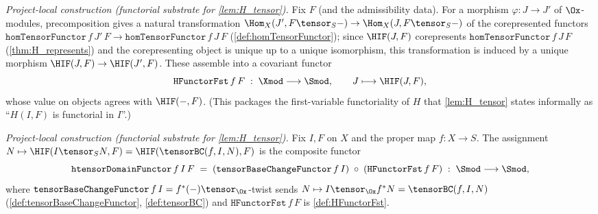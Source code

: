 \begin{definition}

  \label{def:HFunctorFst}
  \textit{Project-local construction (functorial substrate for \cref{lem:H_tensor}).}
  Fix $F$ (and the admissibility data). For a morphism $\varphi : J \to J'$ of
  $\Ox$-modules, precomposition gives a natural transformation
  $\Hom_X(J', F \tensor_S -) \to \Hom_X(J, F \tensor_S -)$ of the corepresented
  functors $\mathtt{homTensorFunctor}\,f\,J'\,F \to \mathtt{homTensorFunctor}\,f\,J\,F$
  (\cref{def:homTensorFunctor}); since $\HIF(J,F)$ corepresents
  $\mathtt{homTensorFunctor}\,f\,J\,F$ (\cref{thm:H_represents}) and the corepresenting
  object is unique up to a unique isomorphism, this transformation is induced by a
  unique morphism $\HIF(J,F) \to \HIF(J',F)$. These assemble into a covariant functor
  \[
    \mathtt{HFunctorFst}\,f\,F \;:\; \Xmod \longrightarrow \Smod, \qquad
    J \longmapsto \HIF(J,F),
  \]
  whose value on objects agrees with $\HIF(-,F)$. (This packages the
  first-variable functoriality of $H$ that \cref{lem:H_tensor} states informally as
  ``$H(I,F)$ is functorial in $I$''.)
\end{definition}

\begin{definition}

  \label{def:htensorDomainFunctor}
  \textit{Project-local construction (functorial substrate for \cref{lem:H_tensor}).}
  Fix $I, F$ on $X$ and the proper map $f : X \to S$. The assignment
  $N \mapsto \HIF(I \tensor_S N, F) = \HIF(\tensorBC(f, I, N), F)$ is the composite
  functor
  \[
    \mathtt{htensorDomainFunctor}\,f\,I\,F
      \;=\; (\mathtt{tensorBaseChangeFunctor}\,f\,I) \;\circ\; (\mathtt{HFunctorFst}\,f\,F)
      \;:\; \Smod \longrightarrow \Smod,
  \]
  where $\mathtt{tensorBaseChangeFunctor}\,f\,I = f^*(-) \tensor_{\Ox}$-twist sends
  $N \mapsto I \tensor_{\Ox} f^* N = \tensorBC(f, I, N)$ (\cref{def:tensorBaseChangeFunctor},
  \cref{def:tensorBC}) and $\mathtt{HFunctorFst}\,f\,F$ is \cref{def:HFunctorFst}.
\end{definition}

